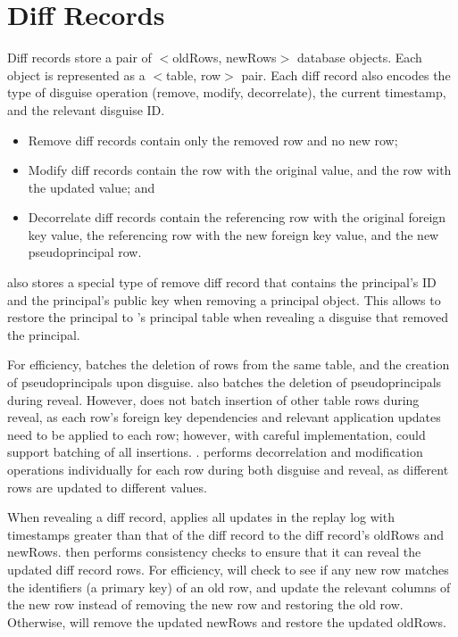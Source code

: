 \section{Diff Records}
Diff records store a pair of $<$oldRows, newRows$>$ database objects.  Each
object is represented as a $<$table, row$>$ pair.  Each diff record also encodes
the type of disguise operation (remove, modify, decorrelate), the current
timestamp, and the relevant
disguise ID.

\begin{itemize}[nosep]
    \item Remove diff records contain only the removed row and no 
        new row;
    \item Modify diff records contain the row with the original value, and the
        row with the updated value; and
    \item Decorrelate diff records contain the referencing row with the original
        foreign key value, the referencing row with the new foreign key value,
        and the new pseudoprincipal row.
\end{itemize}

\sys also stores a special type of remove diff record that contains the
principal's ID and the principal's public key when removing a principal object.
This allows \sys to restore the principal to \sys's principal table when revealing
a disguise that removed the principal.

%
For efficiency, \sys batches the deletion of rows from the same table, and the
creation of pseudoprincipals upon disguise. 
%
\sys also batches the deletion of pseudoprincipals during reveal. However, \sys
does not batch insertion of other table rows during reveal, as each row's
foreign key dependencies and relevant application updates need to be applied to
each row; however, with careful implementation, \sys could support batching of
all insertions.  .
%
\sys performs decorrelation and modification operations individually for each
row during both disguise and reveal, as different rows are updated to different
values.
%

%
When revealing a diff record, \sys applies all updates in the replay log with
timestamps greater than that of the diff record to the diff record's oldRows and
newRows. 
%
\sys then performs consistency checks to ensure that it can reveal the updated
diff record rows.
%
For efficiency, \sys will check to see if any new row matches the identifiers
(\eg a primary key) of an old row, and update the relevant columns of the new
row instead of removing the new row and restoring the old row.
%
Otherwise, \sys will remove the updated newRows and restore the updated oldRows.
%

